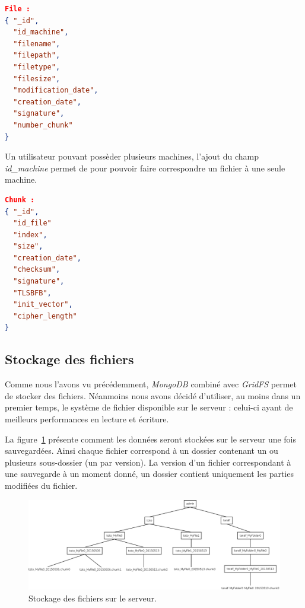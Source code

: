 \documentclass[a4paper,10pt, twoside]{report}
\begin{document}
\begin{spacing}{1.2}
\begin{lstlisting}[language=json]
File :
{ "_id",
  "id_machine",
  "filename",
  "filepath",
  "filetype",
  "filesize",
  "modification_date",
  "creation_date",
  "signature",
  "number_chunk"
}
\end{lstlisting}
Un utilisateur pouvant possèder plusieurs machines, l'ajout du champ
\textit{id\_machine} permet de pour pouvoir faire correspondre un fichier à
une seule machine.

\begin{lstlisting}[language=json]
Chunk :
{ "_id",
  "id_file"
  "index",
  "size",
  "creation_date",
  "checksum",
  "signature",
  "TLSBFB",
  "init_vector",
  "cipher_length"
}
\end{lstlisting}

\subsection{Stockage des fichiers}

Comme nous l'avons vu précédemment, \textit{MongoDB} combiné avec
\textit{GridFS} permet de stocker des fichiers. Néanmoins nous avons
décidé d'utiliser, au moins dans un premier temps, le système de fichier
disponible sur le serveur : celui-ci ayant de meilleurs performances en lecture
et écriture.

La figure~\ref{fileSystemServer} présente comment les données seront stockées
sur le serveur une fois sauvegardées. Ainsi chaque fichier correspond à un
dossier contenant un ou plusieurs sous-dossier (un par version). La version
d'un fichier correspondant à une sauvegarde à un moment donné, un dossier
contient uniquement les parties modifiées du fichier.

\begin{figure}[h!]
  \hspace{-4.5em}
  \includegraphics[width=19cm]{softwareDesign/fileSystemServer.png}
  \caption{\label{fileSystemServer} Stockage des fichiers sur le serveur.}
\end{figure}


\end{spacing}
\end{document}
